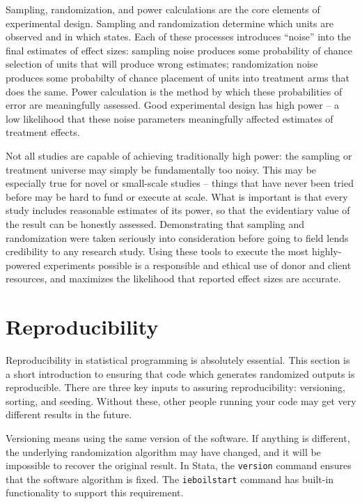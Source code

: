 
\begin{fullwidth}
Sampling, randomization, and power calculations are the core elements of experimental design.
Sampling and randomization determine which units are observed and in which states.
Each of these processes introduces ``noise'' into the final estimates of effect sizes:
sampling noise produces some probability of chance selection of units that will produce wrong estimates;
randomization noise produces some probabilty of chance placement of units into treatment arms that does the same.
Power calculation is the method by which these probabilities of error are meaningfully assessed.
Good experimental design has high power -- a low likelihood that these noise parameters meaningfully affected estimates of treatment effects.

Not all studies are capable of achieving traditionally high power:
the sampling or treatment universe may simply be fundamentally too noisy.
This may be especially true for novel or small-scale studies --
things that have never been tried before may be hard to fund or execute at scale.
What is important is that every study includes reasonable estimates of its power,
so that the evidentiary value of the result can be honestly assessed.
Demonstrating that sampling and randomization were taken seriously into consideration
before going to field lends credibility to any research study.
Using these tools to execute the most highly-powered experiments possible
is a responsible and ethical use of donor and client resources,
and maximizes the likelihood that reported effect sizes are accurate.
\end{fullwidth}

\section{Reproducibility}

Reproducibility in statistical programming is absolutely essential.
This section is a short introduction to ensuring that code
which generates randomized outputs is reproducible.
There are three key inputs to assuring reproducibility:
versioning, sorting, and seeding.
Without these, other people running your code may get very different results in the future.

Versioning means using the same version of the software.
If anything is different, the underlying randomization algorithm may have changed,
and it will be impossible to recover the original result.
In Stata, the \texttt{version} command ensures that the software algorithm is fixed.
The \texttt{ieboilstart} command has built-in functionality to support this requirement.

